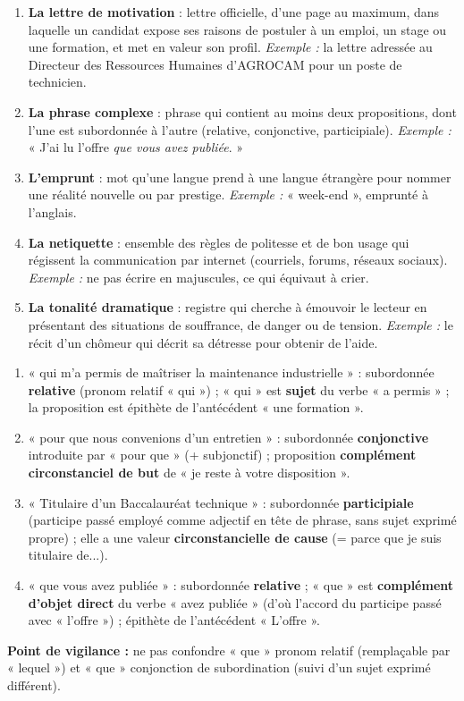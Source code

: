 \documentclass[11pt]{article}
\begin{document}
\begin{corrige}
\begin{enumerate}
\item \textbf{La lettre de motivation} : lettre officielle, d'une page au maximum, dans laquelle un candidat expose ses raisons de postuler à un emploi, un stage ou une formation, et met en valeur son profil. \emph{Exemple :} la lettre adressée au Directeur des Ressources Humaines d'AGROCAM pour un poste de technicien.
\item \textbf{La phrase complexe} : phrase qui contient au moins deux propositions, dont l'une est subordonnée à l'autre (relative, conjonctive, participiale). \emph{Exemple :} « J'ai lu l'offre \emph{que vous avez publiée}. »
\item \textbf{L'emprunt} : mot qu'une langue prend à une langue étrangère pour nommer une réalité nouvelle ou par prestige. \emph{Exemple :} « week-end », emprunté à l'anglais.
\item \textbf{La netiquette} : ensemble des règles de politesse et de bon usage qui régissent la communication par internet (courriels, forums, réseaux sociaux). \emph{Exemple :} ne pas écrire en majuscules, ce qui équivaut à crier.
\item \textbf{La tonalité dramatique} : registre qui cherche à émouvoir le lecteur en présentant des situations de souffrance, de danger ou de tension. \emph{Exemple :} le récit d'un chômeur qui décrit sa détresse pour obtenir de l'aide.
\end{enumerate}
\end{corrige}

\begin{corrige}
\begin{enumerate}
\item « qui m'a permis de maîtriser la maintenance industrielle » : subordonnée \textbf{relative} (pronom relatif « qui ») ; « qui » est \textbf{sujet} du verbe « a permis » ; la proposition est épithète de l'antécédent « une formation ».
\item « pour que nous convenions d'un entretien » : subordonnée \textbf{conjonctive} introduite par « pour que » (+ subjonctif) ; proposition \textbf{complément circonstanciel de but} de « je reste à votre disposition ».
\item « Titulaire d'un Baccalauréat technique » : subordonnée \textbf{participiale} (participe passé employé comme adjectif en tête de phrase, sans sujet exprimé propre) ; elle a une valeur \textbf{circonstancielle de cause} (= parce que je suis titulaire de...).
\item « que vous avez publiée » : subordonnée \textbf{relative} ; « que » est \textbf{complément d'objet direct} du verbe « avez publiée » (d'où l'accord du participe passé avec « l'offre ») ; épithète de l'antécédent « L'offre ».
\end{enumerate}
\textbf{Point de vigilance :} ne pas confondre « que » pronom relatif (remplaçable par « lequel ») et « que » conjonction de subordination (suivi d'un sujet exprimé différent).
\end{corrige}
\end{document}
